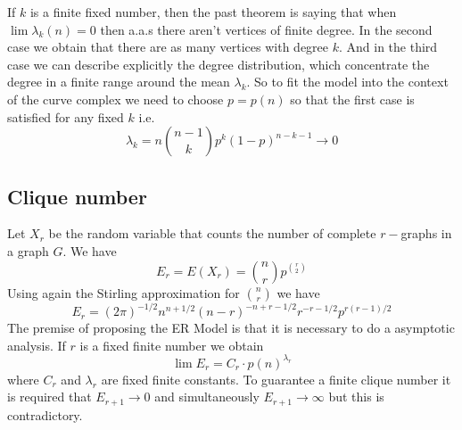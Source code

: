 If $k$ is a finite fixed number, then the past theorem is saying that when $\lim \lambda_{k}(n) = 0$ then a.a.s there aren't vertices of finite degree. In the second case we obtain that there are as many vertices with degree $k$. And in the third case we can describe explicitly the degree distribution, which concentrate the degree in a finite range around the mean $\lambda_{k}$. So to fit the model into the context of the curve complex we need to choose $p = p(n)$ so that the first case is satisfied for any fixed $k$ i.e.
$$\lambda_{k} = n \binom{n-1}{k} p^{k} (1-p)^{n-k-1} \to 0$$

\subsection{Clique number}





Let $X_r$ be the random variable that counts the number of complete $r-$graphs in a graph $G$. We have
$$E_{r} = E(X_r) = \binom{n}{r}p^{\binom{r}{2}}$$
Using again the Stirling approximation for $\binom{n}{r}$ we have
$$E_{r} = (2\pi)^{- 1/2} n^{n+ 1/2} (n - r)^{-n+r-1/2} r^{-r-1/2} p^{r(r- 1)/2}$$
The premise of proposing the ER Model is that it is necessary to do a asymptotic analysis. If $r$ is a fixed finite number we obtain
$$\lim E_{r} = C_{r} \cdot p(n)^{\lambda_{r}}$$
where $C_{r}$ and $\lambda_{r}$ are fixed finite constants. To guarantee a finite clique number it is required that $E_{r+1} \to 0$ and simultaneously $E_{r+1} \to \infty$ but this is contradictory.

